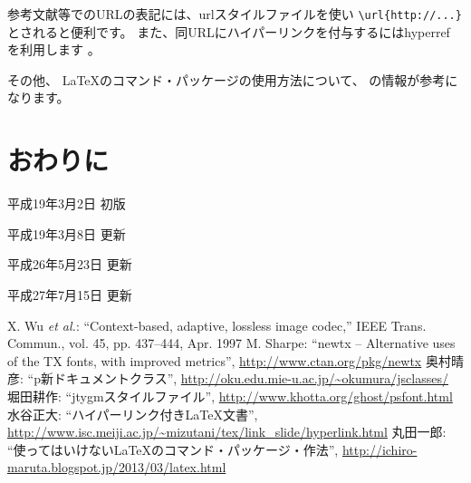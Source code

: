 \documentclass[10pt]{jarticle}
\begin{document}
参考文献等でのURLの表記には、urlスタイルファイルを使い
\verb|\url{http://...}|とされると便利です。
また、同URLにハイパーリンクを付与するにはhyperref を利用します
\cite{mizutani}。

その他、
\LaTeX のコマンド・パッケージの使用方法について、
\cite{maruta}の情報が参考になります。

\section{おわりに}
平成19年3月2日 初版\par
平成19年3月8日 更新\par
平成26年5月23日 更新\par
平成27年7月15日 更新

\def\etal{{\it et al.}}
\begin{thebibliography}{9}
  X. Wu \etal: ``Context-based, adaptive, 
	 lossless image codec,'' IEEE Trans. Commun., vol. 45, pp. 437--444, 
	 Apr. 1997
	 M. Sharpe: ``newtx -- Alternative uses of the TX fonts, with improved metrics'',
         \url{http://www.ctan.org/pkg/newtx}
         奥村晴彦: ``p\LaTeXe 新ドキュメントクラス'',
         \url{http://oku.edu.mie-u.ac.jp/~okumura/jsclasses/}
         堀田耕作: ``jtygmスタイルファイル'',
         \url{http://www.khotta.org/ghost/psfont.html}
         水谷正大: ``ハイパーリンク付きLaTeX文書'',	 
	 \url{http://www.isc.meiji.ac.jp/~mizutani/tex/link_slide/hyperlink.html}
         丸田一郎: ``使ってはいけない\LaTeX のコマンド・パッケージ・作法'',
         \url{http://ichiro-maruta.blogspot.jp/2013/03/latex.html}
\end{thebibliography}

\end{document}
